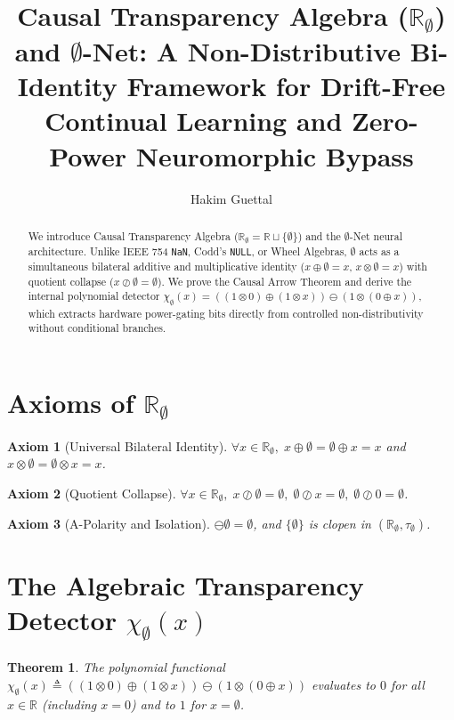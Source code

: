\documentclass[journal]{IEEEtran}
\title{Causal Transparency Algebra ($\mathbb{R}_\emptyset$) and $\emptyset$-Net: A Non-Distributive Bi-Identity Framework for Drift-Free Continual Learning and Zero-Power Neuromorphic Bypass}
\author{Hakim Guettal}
\newtheorem{axiom}{Axiom}
\newtheorem{theorem}{Theorem}
\begin{document}
\maketitle

\begin{abstract}
We introduce Causal Transparency Algebra ($\mathbb{R}_\emptyset = \mathbb{R} \sqcup \{\emptyset\}$) and the $\emptyset$-Net neural architecture. Unlike IEEE 754 \texttt{NaN}, Codd's \texttt{NULL}, or Wheel Algebras, $\emptyset$ acts as a simultaneous bilateral additive and multiplicative identity ($x \oplus \emptyset = x$, $x \otimes \emptyset = x$) with quotient collapse ($x \oslash \emptyset = \emptyset$). We prove the Causal Arrow Theorem and derive the internal polynomial detector $\chi_\emptyset(x) = ((1 \otimes 0) \oplus (1 \otimes x)) \ominus (1 \otimes (0 \oplus x))$, which extracts hardware power-gating bits directly from controlled non-distributivity without conditional branches.
\end{abstract}

\section{Axioms of $\mathbb{R}_\emptyset$}
\begin{axiom}[Universal Bilateral Identity]
$\forall x \in \mathbb{R}_\emptyset, \; x \oplus \emptyset = \emptyset \oplus x = x$ and $x \otimes \emptyset = \emptyset \otimes x = x$.
\end{axiom}
\begin{axiom}[Quotient Collapse]
$\forall x \in \mathbb{R}_\emptyset, \; x \oslash \emptyset = \emptyset, \; \emptyset \oslash x = \emptyset, \; \emptyset \oslash 0 = \emptyset$.
\end{axiom}
\begin{axiom}[A-Polarity and Isolation]
$\ominus \emptyset = \emptyset$, and $\{\emptyset\}$ is clopen in $(\mathbb{R}_\emptyset, \tau_\emptyset)$.
\end{axiom}

\section{The Algebraic Transparency Detector $\chi_\emptyset(x)$}
\begin{theorem}
The polynomial functional $\chi_\emptyset(x) \triangleq ((1 \otimes 0) \oplus (1 \otimes x)) \ominus (1 \otimes (0 \oplus x))$ evaluates to $0$ for all $x \in \mathbb{R}$ (including $x=0$) and to $1$ for $x = \emptyset$.
\end{theorem}
\end{document}
